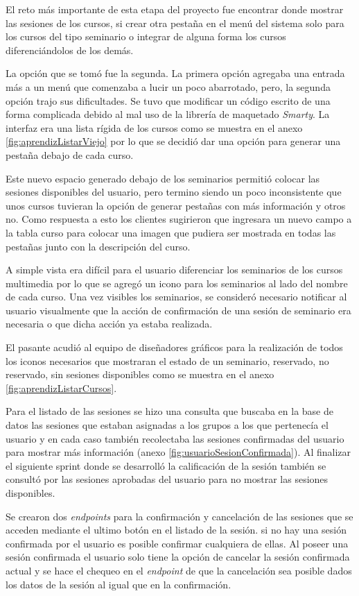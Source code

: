 	El reto más importante de esta etapa del proyecto fue encontrar donde mostrar las sesiones de los cursos, si crear otra pestaña en el menú del sistema solo para los cursos del tipo seminario o integrar de alguna forma los cursos diferenciándolos de los demás.

	La opción que se tomó fue la segunda. La primera opción agregaba una entrada más a un menú que comenzaba a lucir un poco abarrotado, pero, la segunda opción trajo sus dificultades. Se tuvo que modificar un código escrito de una forma complicada debido al mal uso de la librería de maquetado \emph{Smarty}. La interfaz era una lista rígida de los cursos como se muestra en el anexo \ref{fig:aprendizListarViejo} por lo que se decidió dar una opción para generar una pestaña debajo de cada curso.

	Este nuevo espacio generado debajo de los seminarios permitió colocar las sesiones disponibles del usuario, pero termino siendo un poco inconsistente que unos cursos tuvieran la opción de generar pestañas con más información y otros no. Como respuesta a esto los clientes sugirieron que ingresara un nuevo campo a la tabla curso para colocar una imagen que pudiera ser mostrada en todas las pestañas junto con la descripción del curso.

	A simple vista era difícil para el usuario diferenciar los seminarios de los cursos multimedia por lo que se agregó un icono para los seminarios al lado del nombre de cada curso. Una vez visibles los seminarios, se consideró necesario notificar al usuario visualmente que la acción de confirmación de una sesión de seminario era necesaria o que dicha acción ya estaba realizada.

	El pasante acudió al equipo de diseñadores gráficos para la realización de todos los iconos necesarios que mostraran el estado de un seminario, reservado, no reservado, sin sesiones disponibles como se muestra en el anexo \ref{fig:aprendizListarCursos}.

	Para el listado de las sesiones se hizo una consulta que buscaba en la base de datos las sesiones que estaban asignadas a los grupos a los que pertenecía el usuario y en cada caso también recolectaba las sesiones confirmadas del usuario para mostrar más información (anexo \ref{fig:usuarioSesionConfirmada}). Al finalizar el siguiente sprint donde se desarrolló la calificación de la sesión también se consultó por las sesiones aprobadas del usuario para no mostrar las sesiones disponibles.

	Se crearon dos \emph{endpoints} para la confirmación y cancelación de las sesiones que se acceden mediante el ultimo botón en el listado de la sesión. si no hay una sesión confirmada por el usuario es posible confirmar cualquiera de ellas. Al poseer una sesión confirmada el usuario solo tiene la opción de cancelar la sesión confirmada actual y se hace el chequeo en el \emph{endpoint} de que la cancelación sea posible dados los datos de la sesión al igual que en la confirmación.

